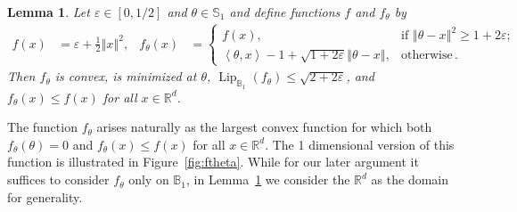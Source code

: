 \documentclass[letter, 12pt]{report}
\newcommand{\R}{\mathbb R}
\newcommand{\ip}[1]{\left \langle #1 \right \rangle}
\newcommand{\sphere}{\mathbb{S}}
\newcommand{\ball}{\mathbb{B}}
\newcommand{\norm}[1]{\left \Vert  #1 \right \Vert}
\newcommand{\lip}{\operatorname{Lip}}
\newcommand{\sind}{\bm{1}}
\newcommand{\1}{\mathbf{1}}
\renewcommand{\epsilon}{\varepsilon}
\theoremstyle{plain}
\newtheorem{lemma}[theorem]{Lemma}
\theoremstyle{definition}
\theoremstyle{remark}
\begin{document}
\begin{lemma}\label{lem:f-theta}
    Let $\epsilon \in [0,1/2]$ and $\theta \in \sphere_1$ and define functions $f$ and $f_\theta$ by
    \begin{align*}
        f(x)        & = \epsilon + \frac{1}{2} \norm{x}^2,                                                                                  &
        f_\theta(x) & = \begin{cases}
                            f(x),                                                        & \text{if } \norm{\theta - x}^2 \geq 1 + 2 \epsilon; \\
                            \ip{\theta, x} - 1 + \sqrt{1 + 2\epsilon} \norm{\theta - x}, & \text{otherwise} \,.
                        \end{cases}
    \end{align*}
    Then $f_\theta$ is convex, is minimized at $\theta$, $\lip_{\ball_1}(f_\theta) \leq \sqrt{2 + 2\epsilon}$, and $f_\theta(x) \leq f(x)$ for all $x \in \R^d$.
\end{lemma}
The function $f_\theta$ arises naturally as the largest convex function for which both $f_\theta(\theta) = 0$ and $f_\theta(x) \leq f(x)$ for all $x \in \R^d$.
The 1 dimensional version of this function is illustrated in Figure~\ref{fig:ftheta}.
While for our later argument it suffices to consider $f_\theta$ only on $\ball_1$, in Lemma~\ref{lem:f-theta} we consider the $\R^d$ as the domain for generality.
\end{document}
